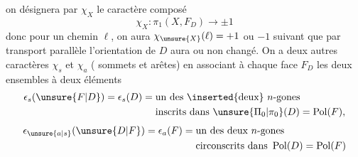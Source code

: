 on désignera par $\chi_X$ le caractère composé
\[\chi_X:\pi_1(X,F_D)\longrightarrow\pm1\]
donc pour un chemin $\ell$, on aura $\chi_{\unsure{X}}(\ell)=+1$ ou $-1$ suivant que par transport parallèle l'orientation de $D$ aura ou non changé. 
On a deux autres caractères $\chi_s$ et $\chi_a$ ( sommets et arêtes) en associant à chaque face $F_D$ les deux ensembles à deux éléments
\[
\begin{aligned}
\epsilon_s(\unsure{F|D})=\epsilon_s(D)={}&\text{un des }\inserted{\text{deux}}\ n\text{-gones}\\
&\text{inscrits dans }\unsure{\Pi_0|\pi_0}(D)=\operatorname{Pol}(F),
\end{aligned}
\]
\[
\begin{aligned}
\epsilon_{\unsure{a|s}}(\unsure{D|F})=\epsilon_a(F)={}&\text{un des deux }n\text{-gones}\\
&\text{circonscrits dans }\operatorname{Pol}(D)=\operatorname{Pol}(F)
\end{aligned}
\]
